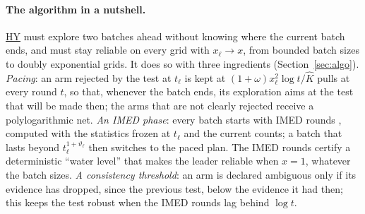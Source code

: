 \documentclass[10pt]{article}
\newcommand{\1}{\mathbf{1}}
\newcommand{\HY}{\hyperref[def:hy]{\textup{HY}}}
\begin{document}
\paragraph{The algorithm in a nutshell.} \HY{} must explore two batches ahead without knowing where the current batch ends, and must stay reliable on every grid with
$x_\ell\to x$, from bounded batch sizes to doubly exponential grids. It does so with three ingredients (Section~\ref{sec:algo}). \emph{Pacing}: an arm rejected by the test at
$t_\ell$ is kept at $(1+\omega)x_\ell^2\log t/\widehat K$ pulls at every round $t$, so that, whenever the batch ends, its exploration aims at the test that will be made then;
the arms that are not clearly rejected receive a polylogarithmic net. \emph{An IMED phase}: every batch starts with IMED rounds \citep{HT15}, computed with the
statistics frozen at $t_\ell$ and the current counts; a batch that lasts beyond $t_\ell^{1+\vartheta_\ell}$ then switches to the paced plan. The IMED rounds certify a
deterministic ``water level'' that makes the leader reliable when $x=1$, whatever the batch sizes. \emph{A consistency threshold}: an arm is declared ambiguous only if its
evidence has dropped, since the previous test, below the evidence it had then; this keeps the test robust when the IMED rounds lag behind $\log t$.
\end{document}
